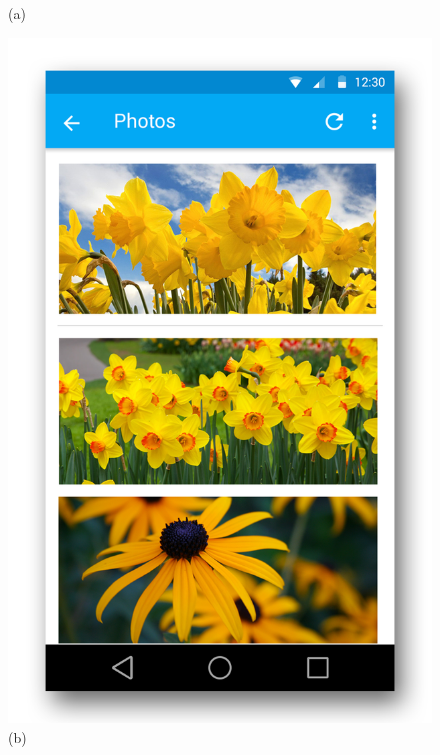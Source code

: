 \documentclass[11pt, a4paper]{report}
\begin{document}
\begin{figure}[h]
\begin{minipage}[b]{0.2\linewidth}
	(a)
\end{minipage}
\begin{minipage}[b]{0.2\linewidth}
	\centering
	\includegraphics[totalheight=6cm]{img/05.png}
	(b)
\end{minipage}
\begin{minipage}[b]{0.2\linewidth}
	\centering

\end{minipage}
\end{figure}
\end{document}
